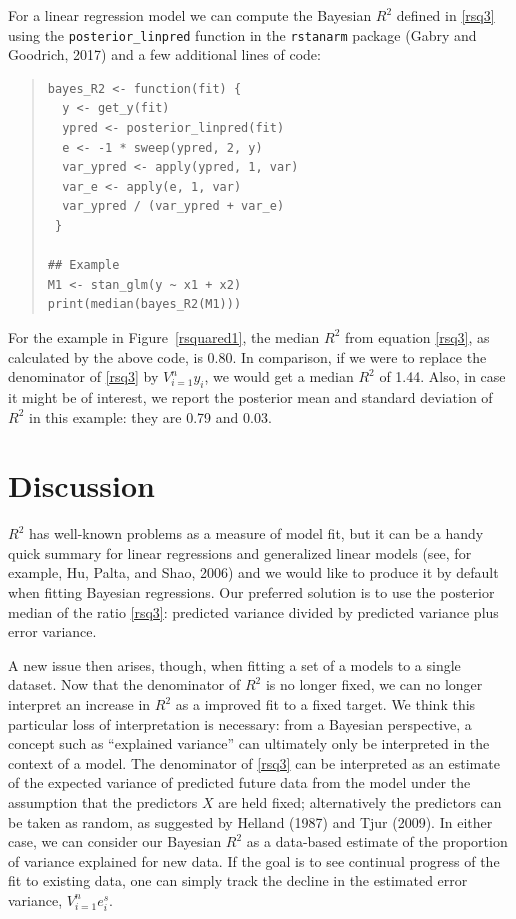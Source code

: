 \documentclass[11pt]{article}
\begin{document}
For a linear regression model we can compute the Bayesian $R^2$ defined in
\eqref{rsq3} using the \verb#posterior_linpred# function in the {\tt rstanarm}
package (Gabry and Goodrich, 2017) and a few additional lines of code:
%
\vspace{-\baselineskip}
\begin{quotation}
\noindent
\begin{small}
\begin{verbatim}
bayes_R2 <- function(fit) {
  y <- get_y(fit)
  ypred <- posterior_linpred(fit)
  e <- -1 * sweep(ypred, 2, y)
  var_ypred <- apply(ypred, 1, var)
  var_e <- apply(e, 1, var)
  var_ypred / (var_ypred + var_e)
 }

## Example
M1 <- stan_glm(y ~ x1 + x2)
print(median(bayes_R2(M1)))
\end{verbatim}
\end{small}
\end{quotation}
%
For the example in Figure~\ref{rsquared1}, the median $R^2$ from
equation \eqref{rsq3}, as calculated by the above code, is 0.80.  In comparison,
if we were to replace the denominator of \eqref{rsq3} by $V_{i=1}^n y_i$, we
would get a median $R^2$ of 1.44.  Also, in case it might be of interest, we
report the posterior mean and standard deviation of $R^2$ in this example:
they are 0.79 and 0.03.

\section{Discussion}
$R^2$ has well-known problems as a measure of model fit, but it can be a handy
quick summary for linear regressions and generalized linear models (see, for
example, Hu, Palta, and Shao, 2006) and we would like to produce it by default
when fitting Bayesian regressions.  Our preferred solution is to use the
posterior median of the ratio \eqref{rsq3}:  predicted variance divided by
predicted variance plus error variance.

A new issue then arises, though, when fitting a set of a models to a single
dataset.  Now that the denominator of $R^2$ is no longer fixed, we can no longer
interpret an increase in $R^2$ as a improved fit to a fixed target.  We think
this particular loss of interpretation is necessary:  from a Bayesian
perspective, a concept such as ``explained variance'' can ultimately only be
interpreted in the context of a model.  The denominator of \eqref{rsq3} can be
interpreted as an estimate of the expected variance of predicted future data
from the model under the assumption that the predictors $X$ are held fixed;
alternatively the predictors can be taken as random, as suggested by Helland
(1987) and Tjur (2009).  In either case, we can consider our Bayesian $R^2$ as a
data-based estimate of the proportion of variance explained for new data. If the
goal is to see continual progress of the fit to existing data, one can simply
track the decline in the estimated error variance, $V_{i=1}^n e_i^s$.
\end{document}
